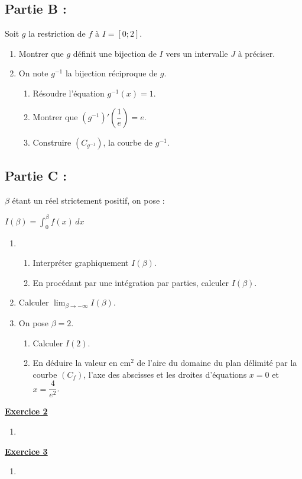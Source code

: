 \documentclass[12pt,a4paper]{article}
\newcommand{\exo}[1]{%
        \textbf{\underline{Exercice #1}}
}
\begin{document}
\begin{multicols}{2}
\subsection*{Partie B : } Soit \( g \) la restriction de \( f \) à \( I = [0;2] \).
\begin{enumerate}
    \item Montrer que \( g \) définit une bijection de \( I \) vers un intervalle \( J \) à préciser.
    \item On note \( g^{-1} \) la bijection réciproque de \( g \).
    \begin{enumerate}
        \item Résoudre l’équation \( g^{-1}(x) = 1 \).
        \item Montrer que \( \left(g^{-1}\right)'\left(\dfrac{1}{e}\right) = e \).
        \item Construire \( (C_{g^{-1}}) \), la courbe de \( g^{-1} \).
    \end{enumerate}
\end{enumerate}


\subsection*{Partie C : } \( \beta \) étant un réel strictement positif, on pose :

\(I(\beta) = \int_0^{\beta} f(x)\,dx \)
\begin{enumerate}
    \item 
    \begin{enumerate}
        \item Interpréter graphiquement \( I(\beta) \).
        \item En procédant par une intégration par parties, calculer \( I(\beta) \).
    \end{enumerate}
    
    \item Calculer \( \lim_{\beta \to -\infty} I(\beta) \).
    
    \item On pose \( \beta = 2 \).
    \begin{enumerate}
        \item Calculer \( I(2) \).
        \item En déduire la valeur en \( \text{cm}^2 \) de l’aire du domaine du plan délimité par la courbe \( (C_f) \), l’axe des abscisses et les droites d’équations \( x = 0 \) et \( x = \dfrac{4}{e^2} \).
    \end{enumerate}
\end{enumerate}

\exo{2} 
\begin{enumerate}
\item
\end{enumerate}

\exo{3} 
\begin{enumerate}
    \item 
\end{enumerate}

\vspace{1em}

\end{multicols}
\end{document}
